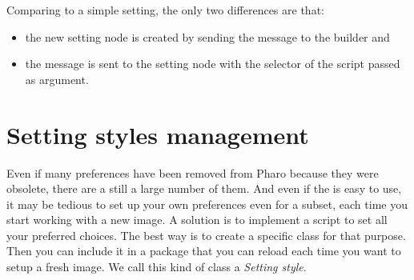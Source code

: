 \documentclass[a4paper,10pt,twoside]{book}
\begin{document}
{Comparing to a simple setting, the only two differences are that:
\begin{itemize}
\item the new setting node is created by sending the  message to the builder and
\item the message  is sent to the setting node with the selector of the script passed as argument.
\end{itemize}

%
%
%
%

\section{Setting styles management}
\label{sec:SettingStylesManagement}
Even if many preferences have been removed from Pharo because they were obsolete, there are a still a large number of them. And even if the \setbrowser is easy to use, it may be tedious to set up your own preferences even for a subset, each time you start working with a new image. A solution is to implement a script to set all your preferred choices. The best way is to create a specific class for that purpose. Then you can include it in a package that you can reload each time you want to setup a fresh image. We call this kind of class a \textit{Setting style}. 

}
\end{document}
